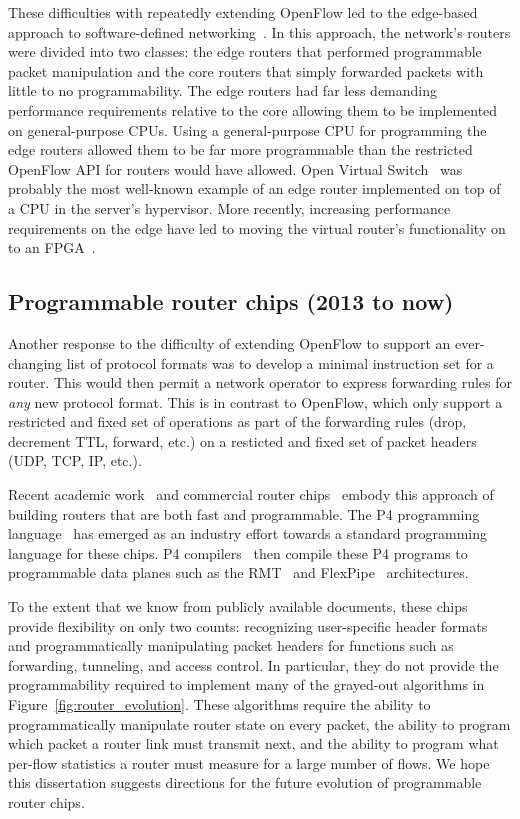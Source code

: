 These difficulties with repeatedly extending OpenFlow led to the edge-based
approach to software-defined networking~\cite{fabric_sdn, nvp, openvswitch}. In
this approach, the network's routers were divided into two classes: the edge
routers that performed programmable packet manipulation and the core routers
that simply forwarded packets with little to no programmability. The edge
routers had far less demanding performance requirements relative to the core
allowing them to be implemented on general-purpose CPUs. Using a
general-purpose CPU for programming the edge routers allowed them to be far
more programmable than the restricted OpenFlow API for routers would have
allowed. Open Virtual Switch~\cite{openvswitch} was probably the most well-known
example of an edge router implemented on top of a CPU in the server's
hypervisor. More recently, increasing performance requirements on the edge have
led to moving the virtual router's functionality on to an
FPGA~\cite{daniel_firestone_nsdi}. 


\subsection{Programmable router chips (2013 to now)}
\label{ss:prog_router_chips}
Another response to the difficulty of extending OpenFlow to support an
ever-changing list of protocol formats was to develop a minimal instruction set
for a router. This would then permit a network operator to express forwarding
rules for {\em any} new protocol format. This is in contrast to OpenFlow, which
only support a restricted and fixed set of operations as part of the forwarding
rules (drop, decrement TTL, forward, etc.) on a resticted and fixed set of
packet headers (UDP, TCP, IP, etc.).

Recent academic work~\cite{rmt} and commercial router chips~\cite{tofino,
flexpipe, xpliant} embody this approach of building routers that are both fast
and programmable. The P4 programming language~\cite{p4} has emerged as an
industry effort towards a standard programming language for these chips.  P4
compilers~\cite{lavanya_compiler} then compile these P4 programs to
programmable data planes such as the RMT~\cite{rmt} and
FlexPipe~\cite{flexpipe} architectures.

To the extent that we know from publicly available documents, these chips
provide flexibility on only two counts: recognizing user-specific header
formats and programmatically manipulating packet headers for functions such as
forwarding, tunneling, and access control. In particular, they do not provide
the programmability required to implement many of the grayed-out algorithms in
Figure~\ref{fig:router_evolution}.  These algorithms require the ability to
programmatically manipulate router state on every packet, the ability to
program which packet a router link must transmit next, and the ability to
program what per-flow statistics a router must measure for a large number of
flows. We hope this dissertation suggests directions for the future evolution
of programmable router chips.

